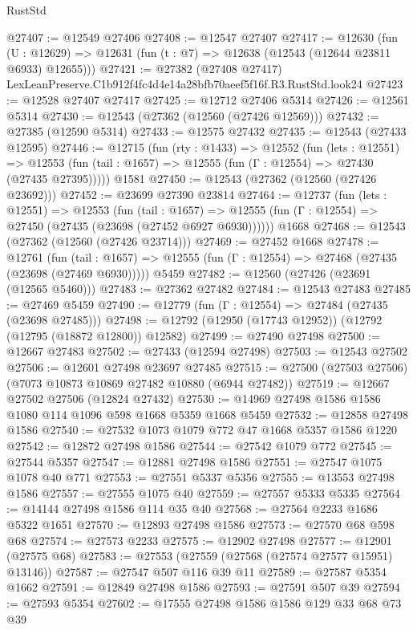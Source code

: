 \begin{lexlean}{RustStd}
\begin{coremodule}
@27407 := @12549 @27406
@27408 := @12547 @27407
@27417 := @12630
    (fun (U : @12629) => @12631 (fun (t : @7) => @12638 (@12543 (@12644 @23811 @6933) @12655)))
@27421 := @27382 (@27408 @27417) LexLeanPreserve.C1b912f4fc4d4e14a28bfb70aeef5f16f.R3.RustStd.look24
@27423 := @12528 @27407 @27417
@27425 := @12712 @27406 @5314
@27426 := @12561 @5314
@27430 := @12543 (@27362 (@12560 (@27426 @12569)))
@27432 := @27385 (@12590 @5314)
@27433 := @12575 @27432
@27435 := @12543 (@27433 @12595)
@27446 := @12715
    (fun (rty : @1433) =>
    @12552
      (fun (lets : @12551) =>
      @12553 (fun (tail : @1657) => @12555 (fun (Γ : @12554) => @27430 (@27435 @27395)))))
    @1581
@27450 := @12543 (@27362 (@12560 (@27426 @23692)))
@27452 := @23699 @27390 @23814
@27464 := @12737
    (fun (lets : @12551) =>
    @12553
      (fun (tail : @1657) =>
      @12555 (fun (Γ : @12554) => @27450 (@27435 (@23698 (@27452 @6927 @6930))))))
    @1668
@27468 := @12543 (@27362 (@12560 (@27426 @23714)))
@27469 := @27452 @1668
@27478 := @12761
    (fun (tail : @1657) => @12555 (fun (Γ : @12554) => @27468 (@27435 (@23698 (@27469 @6930)))))
    @5459
@27482 := @12560 (@27426 (@23691 (@12565 @5460)))
@27483 := @27362 @27482
@27484 := @12543 @27483
@27485 := @27469 @5459
@27490 := @12779 (fun (Γ : @12554) => @27484 (@27435 (@23698 @27485)))
@27498 := @12792 (@12950 (@17743 @12952)) (@12792 (@12795 (@18872 @12800)) @12582)
@27499 := @27490 @27498
@27500 := @12667 @27483
@27502 := @27433 (@12594 @27498)
@27503 := @12543 @27502
@27506 := @12601 @27498 @23697 @27485
@27515 := @27500 (@27503 @27506) (@7073 @10873 @10869 @27482 @10880 (@6944 @27482))
@27519 := @12667 @27502 @27506 (@12824 @27432)
@27530 := @14969 @27498 @1586 @1586 @1080 @114 @1096 @598 @1668 @5359 @1668 @5459
@27532 := @12858 @27498 @1586
@27540 := @27532 @1073 @1079 @772 @47 @1668 @5357 @1586 @1220
@27542 := @12872 @27498 @1586
@27544 := @27542 @1079 @772
@27545 := @27544 @5357
@27547 := @12881 @27498 @1586
@27551 := @27547 @1075 @1078 @40 @771
@27553 := @27551 @5337 @5356
@27555 := @13553 @27498 @1586
@27557 := @27555 @1075 @40
@27559 := @27557 @5333 @5335
@27564 := @14144 @27498 @1586 @114 @35 @40
@27568 := @27564 @2233 @1686 @5322 @1651
@27570 := @12893 @27498 @1586
@27573 := @27570 @68 @598 @68
@27574 := @27573 @2233
@27575 := @12902 @27498
@27577 := @12901 (@27575 @68)
@27583 := @27553 (@27559 (@27568 (@27574 @27577 @15951) @13146))
@27587 := @27547 @507 @116 @39 @11
@27589 := @27587 @5354 @1662
@27591 := @12849 @27498 @1586
@27593 := @27591 @507 @39
@27594 := @27593 @5354
@27602 := @17555 @27498 @1586 @1586 @129 @33 @68 @73 @39

\end{coremodule}
\end{lexlean}

